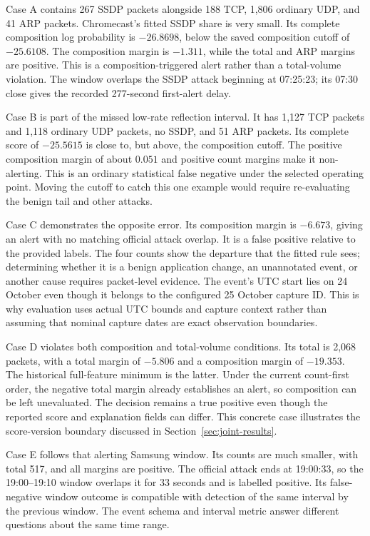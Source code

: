 Case A contains 267 SSDP packets alongside 188 TCP, 1,806 ordinary
UDP, and 41 ARP packets. Chromecast's fitted SSDP share is very small.
Its complete composition log probability is $-26.8698$, below the
saved composition cutoff of $-25.6108$. The composition margin is
$-1.311$, while the total and ARP margins are positive. This is a
composition-triggered alert rather than a total-volume violation.
The window overlaps the SSDP attack beginning at 07:25:23; its
07:30 close gives the recorded 277-second first-alert delay.

Case B is part of the missed low-rate reflection interval. It has
1,127 TCP packets and 1,118 ordinary UDP packets, no SSDP, and
51 ARP packets. Its complete score of $-25.5615$ is close to, but
above, the composition cutoff. The positive composition margin of
about $0.051$ and positive count margins make it non-alerting.
This is an ordinary statistical false negative under the selected operating
point. Moving the cutoff to catch this one example would require
re-evaluating the benign tail and other attacks.

Case C demonstrates the opposite error. Its composition margin
is $-6.673$, giving an alert with no matching official attack
overlap. It is a false positive relative to the provided labels.
The four counts show the departure that the fitted rule sees; determining
whether it is a benign application change, an unannotated event, or another
cause requires packet-level evidence. The event's UTC start
lies on 24 October even though it belongs to the configured
25 October capture ID. This is why evaluation uses actual UTC
bounds and capture context rather than assuming that nominal
capture dates are exact observation boundaries.

Case D violates both composition and total-volume conditions.
Its total is 2,068 packets, with a total margin of $-5.806$ and
a composition margin of $-19.353$. The historical full-feature
minimum is the latter. Under the current count-first order, the
negative total margin already establishes an alert, so composition
can be left unevaluated. The decision remains a true positive
even though the reported score and explanation fields can differ.
This concrete case illustrates the score-version boundary discussed
in Section~\ref{sec:joint-results}.

Case E follows that alerting Samsung window. Its counts are much
smaller, with total 517, and all margins are positive. The official
attack ends at 19:00:33, so the 19:00--19:10 window overlaps it for
33 seconds and is labelled positive. Its false-negative window
outcome is compatible with detection of the same interval by the
previous window. The event schema and interval metric answer different
questions about the same time range.

